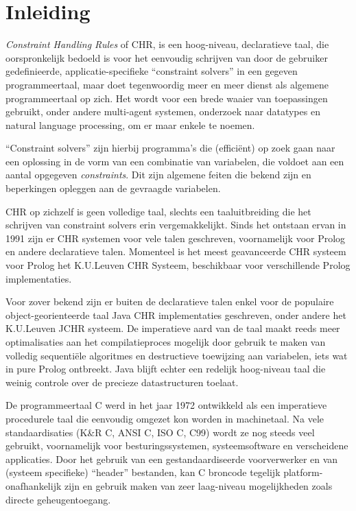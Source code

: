 
\chapter{Inleiding}
\label{chap:inleiding}

{\em Constraint Handling Rules} of CHR, is een hoog-niveau, declaratieve taal, die oorspronkelijk bedoeld is voor het eenvoudig schrijven van door de gebruiker gedefinieerde, applicatie-specifieke ``constraint solvers'' in een gegeven programmeertaal, maar doet tegenwoordig meer en meer dienst als algemene programmeertaal op zich. Het wordt voor een brede waaier van toepassingen gebruikt, onder andere multi-agent systemen, onderzoek naar datatypes en natural language processing, om er maar enkele te noemen.

``Constraint solvers'' zijn hierbij programma's die (effici\"ent) op zoek gaan naar een oplossing in de vorm van een combinatie van variabelen, die voldoet aan een aantal opgegeven {\em constraints}. Dit zijn algemene feiten die bekend zijn en beperkingen opleggen aan de gevraagde variabelen.

CHR op zichzelf is geen volledige taal, slechts een taaluitbreiding die het schrijven van constraint solvers erin vergemakkelijkt. Sinds het ontstaan ervan in 1991 zijn er CHR systemen voor vele talen geschreven, voornamelijk voor Prolog en andere declaratieve talen. Momenteel is het meest geavanceerde CHR systeem voor Prolog het K.U.Leuven CHR Systeem, beschikbaar voor verschillende Prolog implementaties. 

Voor zover bekend zijn er buiten de declaratieve talen enkel voor de populaire object-georienteerde taal Java CHR implementaties geschreven, onder andere het K.U.Leuven JCHR systeem. De imperatieve aard van de taal maakt reeds meer optimalisaties aan het compilatieproces mogelijk door gebruik te maken van volledig sequenti\"ele algoritmes en destructieve toewijzing aan variabelen, iets wat in pure Prolog ontbreekt. Java blijft echter een redelijk hoog-niveau taal die weinig controle over de precieze datastructuren toelaat.

De programmeertaal C werd in het jaar 1972 ontwikkeld als een imperatieve procedurele taal die eenvoudig omgezet kon worden in machinetaal. Na vele standaardisaties (K\&R C, ANSI C, ISO C, C99) wordt ze nog steeds veel gebruikt, voornamelijk voor besturingssystemen, systeemsoftware en verscheidene applicaties. Door het gebruik van een gestandaardiseerde voorverwerker en van (systeem specifieke) ``header'' bestanden, kan C broncode tegelijk platform-onafhankelijk zijn en gebruik maken van zeer laag-niveau mogelijkheden zoals directe geheugentoegang.


